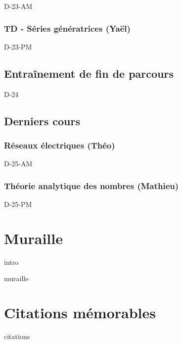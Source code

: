 \documentclass[poly,trombi]{valbonne}
\begin{document}
{D-23-AM}

\subsection{TD - Séries génératrices (Yaël)}

{D-23-PM}


\section{Entraînement de fin de parcours}

{D-24}


\section{Derniers cours}

\subsection{Réseaux électriques (Théo)}

{D-25-AM}

\subsection{Théorie analytique des nombres (Mathieu)}

{D-25-PM}


















\chapter{Muraille}

{intro}

\newpage


{muraille}




\chapter{Citations mémorables}

{citations}
\end{document}
